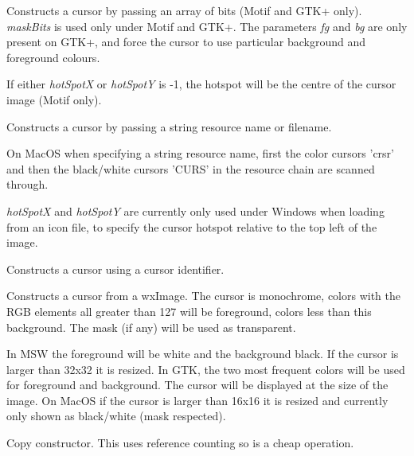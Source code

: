 Constructs a cursor by passing an array of bits (Motif and GTK+ only). {\it maskBits} is used only under
Motif and GTK+. The parameters {\it fg} and {\it bg} are only present on GTK+, and force the
cursor to use particular background and foreground colours.

If either {\it hotSpotX} or {\it hotSpotY} is -1, the hotspot will be the centre of the cursor image (Motif only).


Constructs a cursor by passing a string resource name or filename.

On MacOS when specifying a string resource name, first the color cursors 'crsr' and then the black/white cursors 'CURS' in the resource chain are scanned through.

{\it hotSpotX} and {\it hotSpotY} are currently only used under Windows when loading from an
icon file, to specify the cursor hotspot relative to the top left of the image.


Constructs a cursor using a cursor identifier.


Constructs a cursor from a wxImage. The cursor is monochrome, colors with the RGB elements all greater
than 127 will be foreground, colors less than this background. The mask (if any) will be used as transparent.

In MSW the foreground will be white and the background black. If the cursor is larger than 32x32 it is resized.
In GTK, the two most frequent colors will be used for foreground and background. The cursor will be displayed
at the size of the image.
On MacOS if the cursor is larger than 16x16 it is resized and currently only shown as black/white (mask respected).


Copy constructor. This uses reference counting so is a cheap operation.






